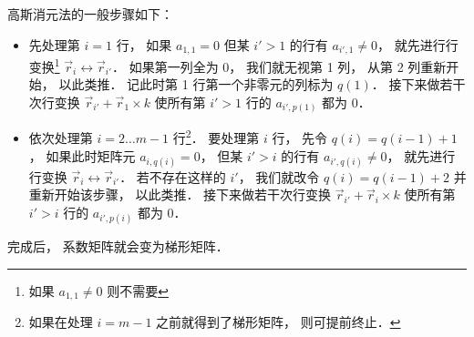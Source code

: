 高斯消元法的一般步骤如下：
\begin{itemize}
\item 先处理第 $i = 1$ 行， 如果 $a_{1,1} = 0$ 但某 $i' > 1$ 的行有 $a_{i', 1} \ne 0$， 就先进行行变换\footnote{如果 $a_{1,1} \ne 0$ 则不需要} $\vec r_i \leftrightarrow \vec r_{i'}$． 如果第一列全为 0， 我们就无视第  1 列， 从第 2 列重新开始， 以此类推． 记此时第 1 行第一个非零元的列标为 $q(1)$． 接下来做若干次行变换 $\vec r_{i'} + \vec r_1 \times k$ 使所有第 $i' > 1$ 行的 $a_{i', p(1)}$ 都为 0．

\item 依次处理第 $i = 2\dots m-1$ 行\footnote{如果在处理 $i = m-1$ 之前就得到了梯形矩阵， 则可提前终止．}． 要处理第 $i$ 行， 先令 $q(i) = q(i-1)+1$， 如果此时矩阵元 $a_{i, q(i)} = 0$， 但某 $i' > i$ 的行有 $a_{i', q(i)} \ne 0$， 就先进行行变换 $\vec r_i \leftrightarrow \vec r_{i'}$． 若不存在这样的 $i'$， 我们就改令 $q(i) = q(i-1) + 2$ 并重新开始该步骤， 以此类推． 接下来做若干次行变换 $\vec r_{i'} + \vec r_i \times k$ 使所有第 $i' > i$ 行的 $a_{i', p(i)}$ 都为 0．
\end{itemize}
完成后， 系数矩阵就会变为梯形矩阵．

